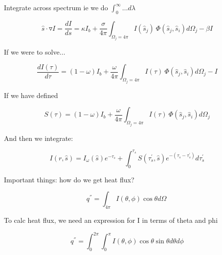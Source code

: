 \documentclass[12pt]{article}
\renewcommand{\_}{\kern-1.5pt\textunderscore\kern-1.5pt}
\begin{document}
Integrate across spectrum ie we do  \(  \int _{0}^{\infty} \ldots  d \lambda   \) \par

 \[ \hat{s} \cdot \triangledown I=\frac{dI}{ds}= \kappa I_{b}+\frac{ \sigma }{4 \pi } \int _{ \Omega _{j}=4 \pi }^{}I \left( \hat{s}_{j} \right) ~ \Phi  \left( \hat{s}_{j},\hat{s}_{i} \right) d \Omega _{j}- \beta I \] \par

If we were to solve$ \ldots $ \par

 \[ \frac{dI \left(  \tau \right) }{d \tau}= \left( 1- \omega  \right)  I_{b}+\frac{ \omega }{4 \pi } \int _{ \Omega _{j}=4 \pi }^{}I \left(  \tau \right) ~ \Phi  \left( \hat{s}_{j},\hat{s}_{i} \right) d \Omega _{j}-I \] \par

If we have defined\par

 \[ S \left(  \tau \right) = \left( 1- \omega  \right)  I_{b}+\frac{ \omega }{4 \pi } \int _{ \Omega _{j}=4 \pi }^{}I \left(  \tau \right) ~ \Phi  \left( \hat{s}_{j},\hat{s}_{i} \right) d \Omega _{j} \] \par

And then we integrate:\par

\par

 \[ I \left( r,\hat{s} \right) =I_{ \omega } \left( \hat{s} \right) e^{- \tau_{s}}+ \int _{0}^{ \tau_{s}}S \left(  \tau_{s}^{'},\hat{s} \right) e^{- \left(  \tau_{s}- \tau_{s}^{'} \right) }d \tau_{s}^{'} \] \par

\par

\par

Important things: how do we get heat flux?\par

 \[ q^{''}= \int _{4 \pi }^{}I  \left(  \theta , \phi  \right)  \cos  \theta d \Omega ~ \] \par

To calc heat flux, we need an expression for I in terms of theta and phi\par

 \[ q^{''}= \int _{0}^{2 \pi } \int _{0}^{ \pi }I \left(  \theta , \phi  \right) \cos  \theta \sin  \theta  d \theta  d \phi  \] \par
\end{document}
